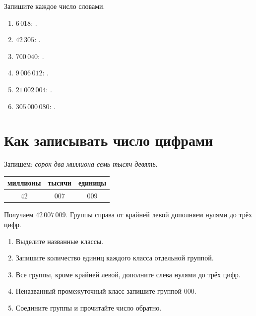 \begin{practicebox}
  Запишите каждое число словами.
  \begin{enumerate}[label=\textbf{\arabic*.}]
    \item \(6\,018\): \answerblank[100mm].
    \item \(42\,305\): \answerblank[95mm].
    \item \(700\,040\): \answerblank[90mm].
    \item \(9\,006\,012\): \answerblank[82mm].
    \item \(21\,002\,004\): \answerblank[75mm].
    \item \(305\,000\,080\): \answerblank[70mm].
  \end{enumerate}
\end{practicebox}

\newpage
\section{Как записывать число цифрами}

\begin{problembox}
  Запишем: \emph{сорок два миллиона семь тысяч девять}.
  \begin{center}
  \renewcommand{\arraystretch}{1.45}
  \begin{tabular}{c|c|c}
    \toprule
    миллионы & тысячи & единицы \\
    \midrule
    \(42\) & \(007\) & \(009\) \\
    \bottomrule
  \end{tabular}
  \end{center}
  Получаем \(42\,007\,009\). Группы справа от крайней левой дополняем нулями
  до трёх цифр.
\end{problembox}

\begin{reflectionbox}
  \begin{enumerate}[label=\textbf{\arabic*.}]
    \item Выделите названные классы.
    \item Запишите количество единиц каждого класса отдельной группой.
    \item Все группы, кроме крайней левой, дополните слева нулями до трёх цифр.
    \item Неназванный промежуточный класс запишите группой \(000\).
    \item Соедините группы и прочитайте число обратно.
  \end{enumerate}
\end{reflectionbox}

